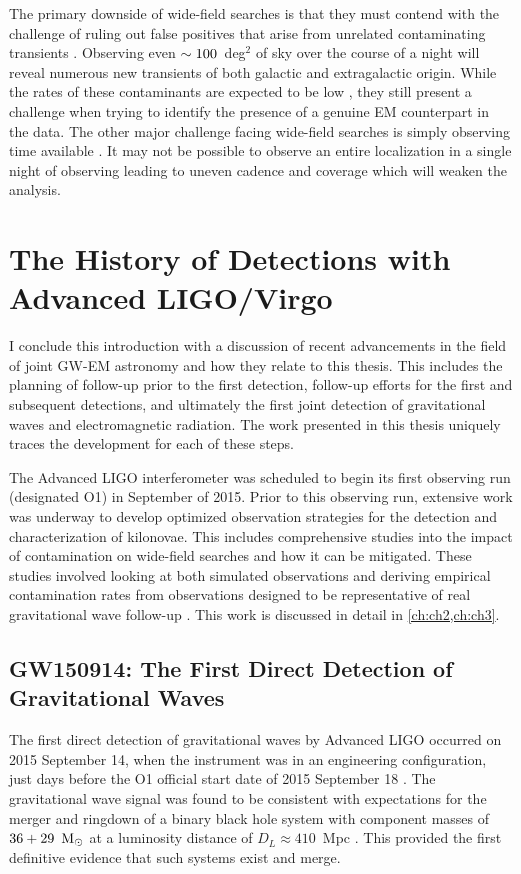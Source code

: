 The primary downside of wide-field searches is that they must contend with the challenge of ruling out false positives that arise from unrelated contaminating transients \citep{CowpBerger15}. Observing even $\sim100$~deg$^2$ of sky over the course of a night will reveal numerous new transients of both galactic and extragalactic origin. While the rates of these contaminants are expected to be low \citep[$\mathcal{R} \apx 2$ events per deg$^2$][]{Cowp+17b}, they still present a challenge when trying to identify the presence of a genuine EM counterpart in the data. The other major challenge facing wide-field searches is simply observing time available \citep{CowpBerger15}. It may not be possible to observe an entire localization in a single night of observing leading to uneven cadence and coverage which will weaken the analysis.

\section{The History of Detections with Advanced LIGO/Virgo}
\label{sec:intro_history}
I conclude this introduction with a discussion of recent advancements in the field of joint GW-EM astronomy and how they relate to this thesis. This includes the planning of follow-up prior to the first detection, follow-up efforts for the first and subsequent detections, and ultimately the first joint detection of gravitational waves and electromagnetic radiation. The work presented in this thesis uniquely traces the development for each of these steps.

The Advanced LIGO interferometer was scheduled to begin its first observing run (designated O1) in September of 2015. Prior to this observing run, extensive work was underway to develop optimized observation strategies for the detection and characterization of kilonovae. This includes comprehensive studies into the impact of contamination on wide-field searches and how it can be mitigated. These studies involved looking at both simulated observations and deriving empirical contamination rates from observations designed to be representative of real gravitational wave follow-up \citep{CowpBerger15,Cowp+17b}. This work is discussed in detail in \cref{ch:ch2,ch:ch3}.

\subsection{GW150914: The First Direct Detection of Gravitational Waves}
\label{sec:intro_gw150914}
The first direct detection of gravitational waves by Advanced LIGO occurred on 2015 September 14, when the instrument was in an engineering configuration, just days before the O1 official start date of 2015 September 18 \citep{LIGOGW150914}. The gravitational  wave signal was found to be consistent with expectations for the merger and ringdown of a binary black hole system with component masses of $36+29~{\rm\,M_\odot}$ at a luminosity distance of $D_L \approx 410$~Mpc \citep{LIGOGW150914}. This provided the first definitive evidence that such systems exist and merge.

